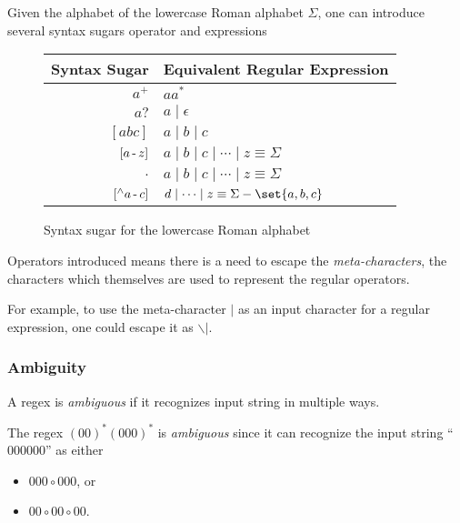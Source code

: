 \begin{example}
    Given the alphabet of the lowercase Roman alphabet $\Sigma$, one can introduce several syntax sugars operator and expressions
    \begin{figure}[H]
        \centering
        \begin{tabular}{@{} r | l @{}}
            \toprule
            Syntax Sugar & Equivalent Regular Expression \\
            \midrule
            $a^+$ & $aa^\ast$  \\
            $a?$ & $a \mid \epsilon$ \\
            $[abc]$ & $a \mid b \mid c$ \\
            $[a \operatorname{-} z]$ & 
                $a \mid b \mid c \mid \cdots \mid z \equiv \Sigma$ \\
            $.$ & 
                $a \mid b \mid c \mid \cdots \mid z \equiv \Sigma$ \\
            $[^{\wedge} a \operatorname{-} c]$ & 
                $d \mid \cdots \mid z \equiv \Sigma - \set{a, b, c}$ \\
            \bottomrule
        \end{tabular}
        \caption{Syntax sugar for the lowercase Roman alphabet}
        \label{fig:roman-syntax-sugar}
    \end{figure}
\end{example}

\begin{remark}
    Operators introduced means there is a need to escape the \textit{meta-characters}, the characters which themselves are used to represent the regular operators.
    
    For example, to use the meta-character $\mid$ as an input character for a regular expression, one could escape it as $\backslash\vert$.
\end{remark}

\subsubsection{Ambiguity}

\begin{definition}[Ambiguous]
    A regex is \textit{ambiguous} if it recognizes input string in multiple ways.
\end{definition}

\begin{example}
    The regex $(00)^\ast (000)^\ast$ is \textit{ambiguous} since it can recognize the input string \enquote{$000000$} as either
    \begin{itemize}
        \item $000 \circ 000$, or
        \item $00 \circ 00 \circ 00$.
    \end{itemize}
\end{example}

